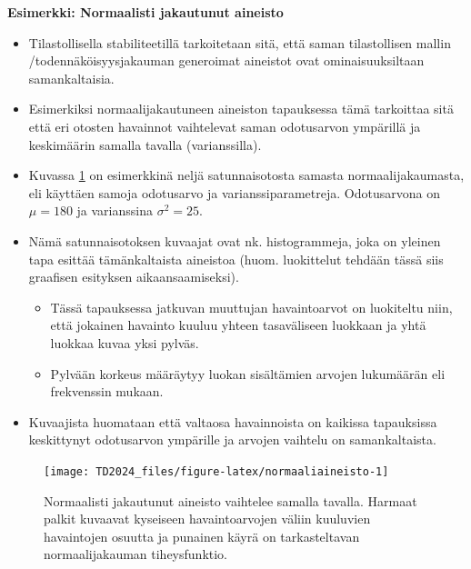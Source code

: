 \documentclass[
]{book}
\providecommand{\tightlist}{%
  \setlength{\itemsep}{0pt}\setlength{\parskip}{0pt}}
\begin{document}
\begin{eblock}{}

\textbf{Esimerkki: Normaalisti jakautunut aineisto}

\begin{itemize}
\tightlist
\item
  Tilastollisella stabiliteetillä tarkoitetaan sitä, että saman tilastollisen mallin /todennäköisyysjakauman generoimat aineistot ovat ominaisuuksiltaan samankaltaisia.\\
\item
  Esimerkiksi normaalijakautuneen aineiston tapauksessa tämä tarkoittaa sitä että eri otosten havainnot vaihtelevat saman odotusarvon ympärillä ja keskimäärin samalla tavalla (varianssilla).\\
\item
  Kuvassa \ref{fig:normaaliaineisto} on esimerkkinä neljä satunnaisotosta samasta normaalijakaumasta, eli käyttäen samoja odotusarvo ja varianssiparametreja. Odotusarvona on \(\mu = 180\) ja varianssina \(\sigma^2 = 25\).
\end{itemize}

\hfill\break

\begin{itemize}
\tightlist
\item
  Nämä satunnaisotoksen kuvaajat ovat nk. histogrammeja, joka on yleinen tapa esittää tämänkaltaista aineistoa (huom. luokittelut tehdään tässä siis graafisen esityksen aikaansaamiseksi).

  \begin{itemize}
  \tightlist
  \item
    Tässä tapauksessa jatkuvan muuttujan havaintoarvot on luokiteltu niin, että jokainen havainto kuuluu yhteen tasaväliseen luokkaan ja yhtä luokkaa kuvaa yksi pylväs.
  \item
    Pylvään korkeus määräytyy luokan sisältämien arvojen lukumäärän eli frekvenssin mukaan.
  \end{itemize}
\item
  Kuvaajista huomataan että valtaosa havainnoista on kaikissa tapauksissa keskittynyt odotusarvon ympärille ja arvojen vaihtelu on samankaltaista.
\end{itemize}

\end{eblock}

\begin{figure}

{\centering \texttt{[image: TD2024\_files/figure-latex/normaaliaineisto-1]} 

}

\caption{Normaalisti jakautunut aineisto vaihtelee samalla tavalla. Harmaat palkit kuvaavat kyseiseen havaintoarvojen väliin kuuluvien havaintojen osuutta ja punainen käyrä on tarkasteltavan normaalijakauman tiheysfunktio.}\label{fig:normaaliaineisto}
\end{figure}
\end{document}
